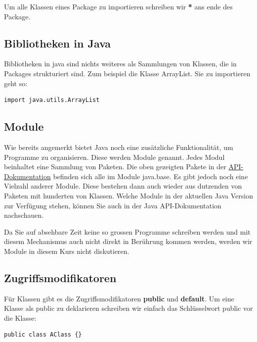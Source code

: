 \documentclass[12pt]{article}
\begin{document}
    Um alle Klassen eines Package zu importieren schreiben wir \textbf{*} ans ende des Package. 

    \subsection*{Bibliotheken in Java}

    Bibliotheken in java sind nichts weiteres als Sammlungen von Klassen, die in Packages strukturiert sind. Zum beispiel die 
    Klasse ArrayList. Sie zu importieren geht so:

    \begin{lstlisting}[caption=ArrayList]
import java.utils.ArrayList
    \end{lstlisting}


    \subsection*{Module}

    Wie bereits angemerkt bietet Java noch eine zusätzliche Funktionalität, um Programme zu organisieren. Diese werden Module genannt. 
    Jedes Modul beinhaltet eine Sammlung von Paketen. 
    Die oben gezeigten Pakete in der \href{https://docs.oracle.com/en/java/javase/17/docs/api/index.html}{API-Dokumentation} befinden sich alle im Module java.base. 
    Es gibt jedoch noch eine Vielzahl anderer Module. 
    Diese bestehen dann auch wieder aus dutzenden von Paketen mit hunderten von Klassen. 
    Welche Module in der aktuellen Java Version zur Verfügung stehen, können Sie auch in der Java API-Dokumentation nachschauen.

    Da Sie auf absehbare Zeit keine so grossen Programme schreiben werden und mit diesem Mechanismus auch nicht direkt in Berührung kommen werden, 
    werden wir Module in diesem Kurs nicht diskutieren.

    \subsection*{Zugriffsmodifikatoren}

    Für Klassen gibt es die Zugriffsmodifikatoren \textbf{public} und \textbf{default}.
    Um eine Klasse als public zu deklarieren schreiben wir einfach das Schlüsselwort public vor die Klasse:

    \begin{lstlisting}[caption=public]
public class AClass {}
    \end{lstlisting}
\end{document}
